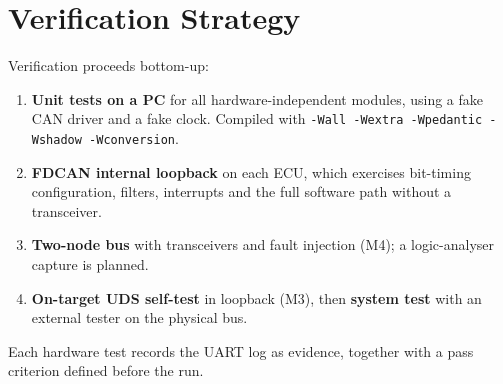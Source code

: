 \section{Verification Strategy}

Verification proceeds bottom-up:
\begin{enumerate}[nosep]
  \item \textbf{Unit tests on a PC} for all hardware-independent modules, using a fake CAN driver and a fake clock. Compiled with \texttt{-Wall -Wextra -Wpedantic -Wshadow -Wconversion}.
  \item \textbf{FDCAN internal loopback} on each ECU, which exercises bit-timing configuration, filters, interrupts and the full software path without a transceiver.
  \item \textbf{Two-node bus} with transceivers and fault injection (M4); a logic-analyser capture is planned.
  \item \textbf{On-target UDS self-test} in loopback (M3), then \textbf{system test} with an external tester on the physical bus.
\end{enumerate}
Each hardware test records the UART log as evidence, together with a pass criterion defined before the run.
